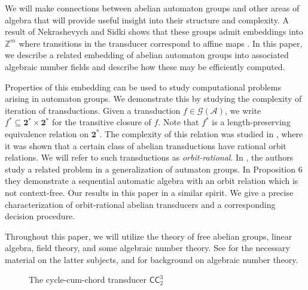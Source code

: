 \documentclass[12pt, letterpaper]{article}
\newcommand{\Z}{\mathbb Z}
\newcommand{\bin}{\mathbf 2}
\newcommand{\A}{\mathcal A}
\newcommand{\CC}{\mathsf{CC}}
\newcommand{\gp}{\mathcal G}
\begin{document}
We will make connections between abelian automaton groups and other areas of
algebra that will provide useful insight into their structure and complexity.
A result of Nekrashevych and Sidki shows that these groups admit embeddings
into $\Z^m$ where transitions in the transducer correspond to affine maps
\cite{nekrashevych2004automorphisms}.  In this paper, we describe a related
embedding of abelian automaton groups into associated algebraic number fields
and describe how these may be efficiently computed.

Properties of this embedding can be used to study computational problems
arising in automaton groups. We demonstrate this by studying the complexity
of iteration of transductions. Given a transduction $f \in \gp(\A)$, we write
$f^* \subseteq \bin^* \times \bin^*$ for the transitive closure of $f$.  Note
that $f^*$ is a length-preserving equivalence relation on $\bin^*$.  The
complexity of this relation was studied in \cite{jalc170214}, where it
was shown that a certain class of abelian transductions have rational orbit
relations.  We will refer to such transductions as \emph{orbit-rational}.
In \cite{BroughKhoussainovNelson08:sequential_automatic}, the authors study a
related problem in a generalization of autmaton groups.  In Proposition 6
they demonstrate a sequential automatic algebra with an orbit relation which is
not context-free. Our results in this paper in a similar spirit. We give a
precise characterization of orbit-rational abelian transducers and a
corresponding decision procedure.

Throughout this paper, we will utilize the theory of free abelian groups,
linear algebra, field theory, and some algebraic number theory. See
\cite{Hungerford78} for the necessary material on the latter subjects, and
\cite{ireland1990classical, stein2012algebraic} for background on algebraic
number theory.
\begin{figure}[hb]
    \centering
    \caption{The cycle-cum-chord transducer $\CC^3_2$}
    \label{fig:cc-3-2}
\end{figure}
\end{document}
